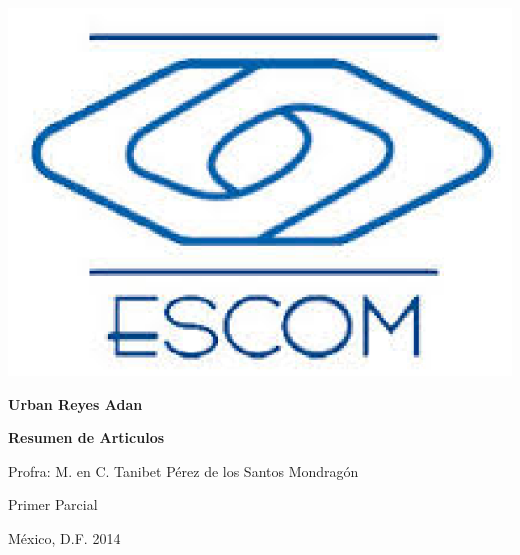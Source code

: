 \begin{minipage}{0.20\textwidth}
	\includegraphics[width=1\textwidth]{portada/escom.eps}

\end{minipage}%

\vspace{3cm}
\centerline{\Large \bf Urban Reyes Adan}


\vspace{2cm}
\centerline{\Large  \bf Resumen de Articulos}

\vspace{2cm}

\centerline{\Large Profra: M. en C. Tanibet Pérez de los Santos Mondragón }
\vspace{1.5cm}
\centerline{\Large  Primer Parcial }

 
\vspace{3cm}
{\large  M\'{e}xico, D.F. \hfill 2014}
